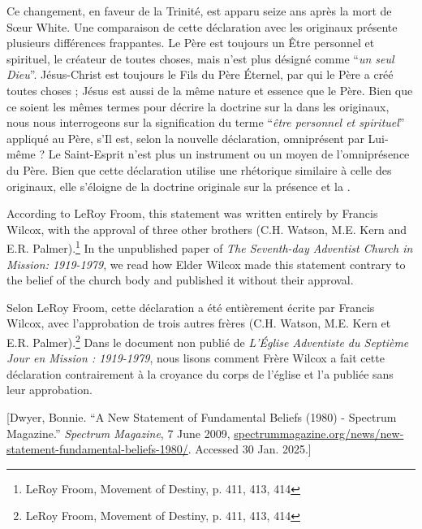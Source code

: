 Ce changement, en faveur de la Trinité, est apparu seize ans après la mort de Sœur White. Une comparaison de cette déclaration avec les  originaux présente plusieurs différences frappantes. Le Père est toujours un Être personnel et spirituel, le créateur de toutes choses, mais n'est plus désigné comme “\textit{un seul Dieu}”. Jésus-Christ est toujours le Fils du Père Éternel, par qui le Père a créé toutes choses ; Jésus est aussi de la même nature et essence que le Père. Bien que ce soient les mêmes termes pour décrire la doctrine sur la  dans les  originaux, nous nous interrogeons sur la signification du terme “\textit{être personnel et spirituel}” appliqué au Père, s'Il est, selon la nouvelle déclaration, omniprésent par Lui-même ? Le Saint-Esprit n'est plus un instrument ou un moyen de l'omniprésence du Père. Bien que cette déclaration utilise une rhétorique similaire à celle des  originaux, elle s'éloigne de la doctrine originale sur la présence et la .


According to LeRoy Froom, this statement was written entirely by Francis Wilcox, with the approval of three other brothers (C.H. Watson, M.E. Kern and E.R. Palmer).\footnote{LeRoy Froom, Movement of Destiny, p. 411, 413, 414} In the unpublished paper of \textit{The Seventh-day Adventist Church in Mission: 1919-1979}, we read how Elder Wilcox made this statement contrary to the belief of the church body and published it without their approval.


Selon LeRoy Froom, cette déclaration a été entièrement écrite par Francis Wilcox, avec l'approbation de trois autres frères (C.H. Watson, M.E. Kern et E.R. Palmer).\footnote{LeRoy Froom, Movement of Destiny, p. 411, 413, 414} Dans le document non publié de \textit{L'Église Adventiste du Septième Jour en Mission : 1919-1979}, nous lisons comment Frère Wilcox a fait cette déclaration contrairement à la croyance du corps de l'église et l'a publiée sans leur approbation.


[Dwyer, Bonnie. “A New Statement of Fundamental Beliefs (1980) - Spectrum Magazine.” \textit{Spectrum Magazine}, 7 June 2009, \href{https://spectrummagazine.org/news/new-statement-fundamental-beliefs-1980/}{spectrummagazine.org/news/new-statement-fundamental-beliefs-1980/}. Accessed 30 Jan. 2025.]


